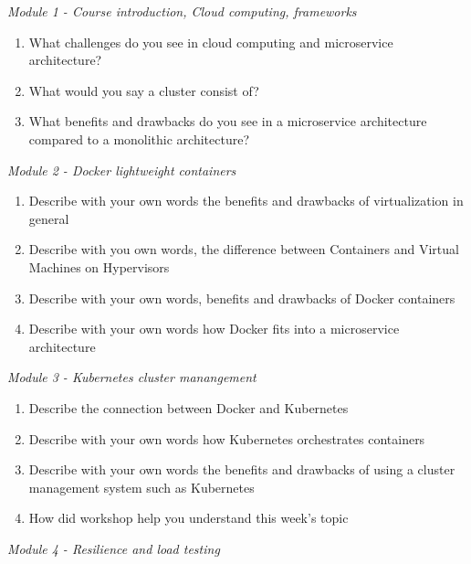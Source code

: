 \noindent\textit{Module 1 - Course introduction, Cloud computing, frameworks}\\

\vspace{-5mm}
\begin{enumerate}
\setlength\itemsep{0.05em}
  \item What challenges do you see in cloud computing and microservice architecture?
  \item What would you say a cluster consist of?
  \item What benefits and drawbacks do you see in a microservice architecture compared to a monolithic architecture?
\end{enumerate}

\noindent\textit{Module 2 - Docker lightweight containers}\\

\vspace{-5mm}
\begin{enumerate}
\setlength\itemsep{0.05em}
  \item Describe with your own words the benefits and drawbacks of virtualization in general
  \item Describe with you own words, the difference between Containers and Virtual Machines on Hypervisors
  \item Describe with your own words, benefits and drawbacks of Docker containers
  \item Describe with your own words how Docker fits into a microservice architecture
\end{enumerate}


\noindent\textit{Module 3 - Kubernetes cluster manangement}\\

\vspace{-5mm}
\begin{enumerate}
\setlength\itemsep{0.05em}
    \item Describe the connection between Docker and Kubernetes
    \item Describe with your own words how Kubernetes orchestrates containers
    \item Describe with your own words the benefits and drawbacks of using a cluster management system such as Kubernetes
    \item How did workshop help you understand this week's topic
\end{enumerate}

\noindent\textit{Module 4 - Resilience and load testing}\\

